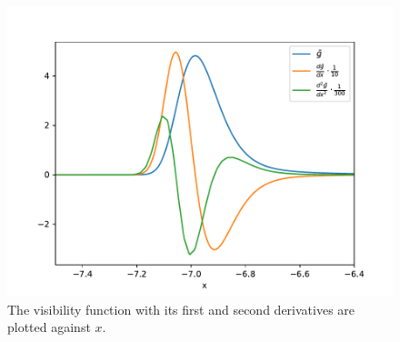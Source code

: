 \documentclass{aa}
\begin{document}
\begin{figure}[H]
   \includegraphics[scale=0.5]{../figures/milestone2/g_tilde_plots.pdf}
   \caption{The visibility function with its first and second derivatives are plotted against $x$.}\label{fig:M2:g_tilde_plots}
\end{figure}
\end{document}
